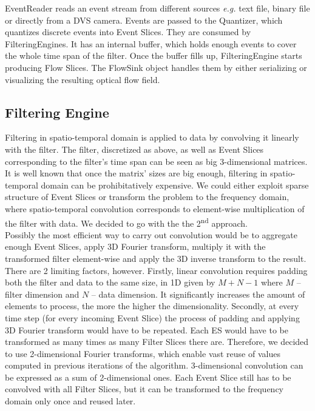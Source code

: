 EventReader reads an event stream from different sources \emph{e.g.} text file, binary file or directly from a DVS camera.
Events are passed to the Quantizer, which quantizes discrete events into Event Slices.
They are consumed by FilteringEngines. It has an internal buffer, which holds enough events to cover the whole time span of the filter. 
Once the buffer fills up, FilteringEngine starts producing Flow Slices.
The FlowSink object handles them by either serializing or visualizing the resulting optical flow field.

\subsection{Filtering Engine}

Filtering in spatio-temporal domain is applied to data by convolving it linearly with the filter.
The filter, discretized as above, as well as Event Slices corresponding to the filter's time span can be seen as big 3-dimensional matrices.
It is well known that once the matrix' sizes are big enough, filtering in spatio-temporal domain can be prohibitatively expensive.
We could either exploit sparse structure of Event Slices or transform the problem to the frequency domain, where spatio-temporal convolution corresponds to element-wise multiplication of the filter with data.
We decided to go with the the 2\textsuperscript{nd} approach.
\\

Possibly the most efficient way to carry out convolution would be to aggregate enough Event Slices, apply 3D Fourier transform, multiply it with the transformed filter element-wise and apply the 3D inverse transform to the result.
There are 2 limiting factors, however.
Firstly, linear convolution requires padding both the filter and data to the same size, in 1D given by $M+N-1$ where $M$ -- filter dimension and $N$ -- data dimension.
It significantly increases the amount of elements to process, the more the higher the dimensionality.
Secondly, at every time step (for every incoming Event Slice) the process of padding and applying 3D Fourier transform would have to be repeated.
Each ES would have to be transformed as many times as many Filter Slices there are.
Therefore, we decided to use 2-dimensional Fourier transforms, which enable vast reuse of values computed in previous iterations of the algorithm.
3-dimensional convolution can be expressed as a sum of 2-dimensional ones.
Each Event Slice still has to be convolved with all Filter Slices, but it can be transformed to the frequency domain only once and reused later.

